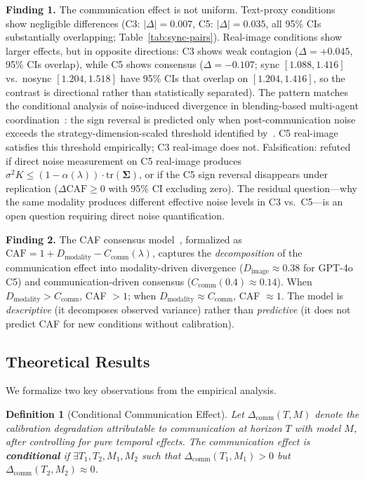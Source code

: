 \documentclass[11pt]{article}
\newtheorem{definition}{Definition}
\begin{document}
\textbf{Finding 1.} The communication effect is not uniform. Text-proxy conditions show negligible differences (C3: $|\Delta| = 0.007$, C5: $|\Delta| = 0.035$, all 95\% CIs substantially overlapping; Table~\ref{tab:sync-pairs}). Real-image conditions show larger effects, but in opposite directions: C3 shows weak contagion ($\Delta = +0.045$, 95\% CIs overlap), while C5 shows consensus ($\Delta = -0.107$; sync $[1.088, 1.416]$ vs.\ nosync $[1.204, 1.518]$ have 95\% CIs that overlap on $[1.204, 1.416]$, so the contrast is directional rather than statistically separated). The pattern matches the conditional analysis of noise-induced divergence in blending-based multi-agent coordination~\cite{kapetanakis2014balanced,foerster2016learning}: the sign reversal is predicted only when post-communication noise exceeds the strategy-dimension-scaled threshold identified by~\citet{foerster2016learning}. C5 real-image satisfies this threshold empirically; C3 real-image does not. Falsification: refuted if direct noise measurement on C5 real-image produces $\sigma^2 K \leq (1 - \alpha(\lambda)) \cdot \text{tr}(\boldsymbol{\Sigma})$, or if the C5 sign reversal disappears under replication ($\Delta\text{CAF} \geq 0$ with 95\% CI excluding zero). The residual question---why the same modality produces different effective noise levels in C3 vs.\ C5---is an open question requiring direct noise quantification.

\textbf{Finding 2.} The CAF consensus model~\cite{mmepc2026}, formalized as $\text{CAF} = 1 + D_{\text{modality}} - C_{\text{comm}}(\lambda)$, captures the \textit{decomposition} of the communication effect into modality-driven divergence ($D_{\text{image}} \approx 0.38$ for GPT-4o C5) and communication-driven consensus ($C_{\text{comm}}(0.4) \approx 0.14$). When $D_{\text{modality}} > C_{\text{comm}}$, CAF $> 1$; when $D_{\text{modality}} \approx C_{\text{comm}}$, CAF $\approx 1$. The model is \textit{descriptive} (it decomposes observed variance) rather than \textit{predictive} (it does not predict CAF for new conditions without calibration).


\subsection{Theoretical Results}

We formalize two key observations from the empirical analysis.

\begin{definition}[Conditional Communication Effect]
Let $\Delta_{\text{comm}}(T, M)$ denote the calibration degradation attributable to communication at horizon $T$ with model $M$, after controlling for pure temporal effects. The communication effect is \textbf{conditional} if $\exists T_1, T_2, M_1, M_2$ such that $\Delta_{\text{comm}}(T_1, M_1) > 0$ but $\Delta_{\text{comm}}(T_2, M_2) \approx 0$.
\end{definition}
\end{document}
